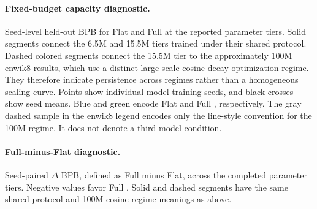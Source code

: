 \paragraph{Fixed-budget capacity diagnostic.}
Seed-level held-out BPB for Flat and Full \ilm{} at the reported parameter tiers.
Solid segments connect the 6.5M and 15.5M tiers trained under their shared
protocol. Dashed colored segments connect the 15.5M tier to the
approximately 100M enwik8 results, which use a distinct large-scale
cosine-decay optimization regime. They therefore indicate persistence across
regimes rather than a homogeneous scaling curve. Points show individual
model-training seeds, and black crosses show seed means. Blue and green encode
Flat and Full \ilm{}, respectively. The gray dashed sample in the enwik8 legend
encodes only the line-style convention for the 100M regime. It does not denote
a third model condition.

\paragraph{Full-minus-Flat diagnostic.}
Seed-paired $\Delta$ BPB, defined as Full minus Flat, across the completed
parameter tiers. Negative values favor Full \ilm{}. Solid and dashed segments
have the same shared-protocol and 100M-cosine-regime meanings as above.
